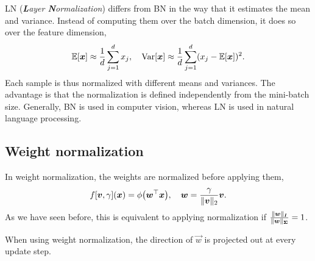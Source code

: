 LN (\textit{\textbf{L}ayer \textbf{N}ormalization}) \citep{lei2016layer} differs from BN in the way
that it estimates the mean and variance. Instead of computing them over the batch dimension, it
does so over the feature dimension, \[
    \mathbb{E}[\bm{x}] \approx \frac{1}{d} \sum_{j=1}^{d} x_j, \quad \mathrm{Var}[\bm{x}] \approx \frac{1}{d} \sum_{j=1}^{d} (x_j - \mathbb{E}[\bm{x}])^2.
\]
Each sample is thus normalized with different means and variances. The advantage is that the
normalization is defined independently from the mini-batch size. Generally, BN is used in computer
vision, whereas LN is used in natural language processing.

\subsection{Weight normalization}

In weight normalization, the weights are normalized before applying them, \[
    f[\vec{v}, \gamma](\vec{x}) = \phi \lft( \transpose{\vec{w}}\vec{x} \rgt), \quad \vec{w} = \frac{\gamma}{\| \vec{v} \|_2} \vec{v}.
\]
As we have seen before, this is equivalent to applying normalization if $\frac{\| \bm{w}
    \|_{\bm{I}}}{\| \bm{w} \|_{\bm{\Sigma}}} = 1$.

\begin{marginfigure}
    \centering
    \caption{When using weight normalization, the direction of $\vec{w}$ is projected out at every update step.}
    \label{fig:weight-norm-projection}
\end{marginfigure}

